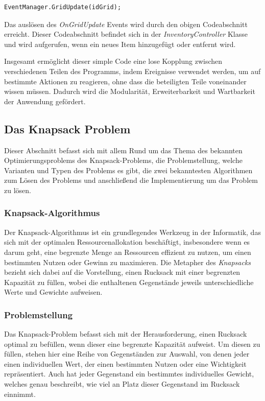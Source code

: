 \begin{lstlisting}[style=csharp label=code:Event Trigger]
EventManager.GridUpdate(idGrid);
\end{lstlisting}

Das auslösen des \textit{OnGridUpdate} Events wird durch den obigen Codeabschnitt erreicht. Dieser Codeabschnitt befindet
sich in der \textit{InventoryController} Klasse und wird aufgerufen, wenn ein neues Item hinzugefügt oder entfernt wird.

Insgesamt ermöglicht dieser simple Code eine lose Kopplung zwischen verschiedenen Teilen des Programms, indem Ereignisse verwendet
werden, um auf bestimmte Aktionen zu reagieren, ohne dass die beteiligten Teile voneinander wissen müssen. Dadurch wird die
Modularität, Erweiterbarkeit und Wartbarkeit der Anwendung gefördert.

\subsection{Das Knapsack Problem} 
Dieser Abschnitt befasst sich mit allem Rund um das Thema des bekannten Optimierungsproblems des Knapsack-Problems, die
Problemstellung, welche Varianten und Typen des Problems es gibt, die zwei bekanntesten Algorithmen zum Lösen des Problems
und anschließend die Implementierung um das Problem zu lösen.

\subsubsection{Knapsack-Algorithmus}
Der Knapsack-Algorithmus ist ein grundlegendes Werkzeug in der Informatik, das sich mit der optimalen Ressourcenallokation
beschäftigt, insbesondere wenn es darum geht, eine begrenzte Menge an Ressourcen effizient zu nutzen, um einen bestimmten
Nutzen oder Gewinn zu maximieren. Die Metapher des \textit{Knapsacks} bezieht sich dabei auf die Vorstellung, einen Rucksack
mit einer begrenzten Kapazität zu füllen, wobei die enthaltenen Gegenstände jeweils unterschiedliche Werte und Gewichte aufweisen.

\subsubsection{Problemstellung}
Das Knapsack-Problem befasst sich mit der Herausforderung, einen Rucksack optimal zu befüllen, wenn dieser eine begrenzte
Kapazität aufweist. Um diesen zu füllen, stehen hier eine Reihe von Gegenständen zur Auswahl, von denen jeder einen
individuellen Wert, der einen bestimmten Nutzen oder eine Wichtigkeit repräsentiert. Auch hat jeder Gegenstand ein
bestimmtes individuelles Gewicht, welches genau beschreibt, wie viel an Platz dieser Gegenstand im Rucksack einnimmt.

